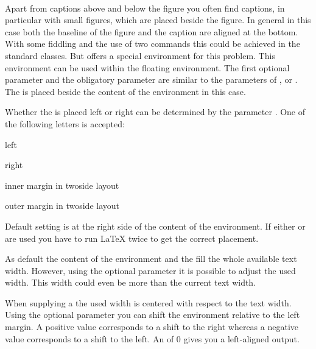 \begin{Declaration}
    \\%
    \PValue{*}
\end{Declaration}
%
Apart from
captions above and below the figure you often find captions, in
particular with small figures, which are placed beside the figure. In
general in this case both the baseline of the figure and the caption
are aligned at the bottom. With some fiddling and the use of two
 commands this could be achieved in the standard
classes.  But \KOMAScript{} offers a special environment for this
problem. This environment can be used within the floating environment.
The first optional parameter  and the obligatory
parameter  are similar to the parameters of
,  or . The
 is placed beside the content of the environment in this
case.

Whether the  is placed left or right can be determined by
the parameter . One of the following letters is
accepted:
\begin{labeling}[--~]{\PValue[o]}
\item[\PValue{l}] left
\item[\PValue{r}] right
\item[\PValue{i}] inner margin in twoside layout
\item[\PValue{o}] outer margin in twoside layout
\end{labeling}
Default setting is at the right side of the content of the
environment.  If either  or  are used you have to
run {\LaTeX} twice to get the correct placement.

As default the content of the environment and the  fill
the whole available text width. However, using the optional parameter
 it is possible to adjust the used width. This width
could even be more than the current text width.

When supplying a  the used width is centered with respect
to the text width. Using the optional parameter  you can
shift the environment relative to the left margin. A positive value
corresponds to a shift to the right whereas a negative value
corresponds to a shift to the left. An  of 0
gives you a left-aligned output.

